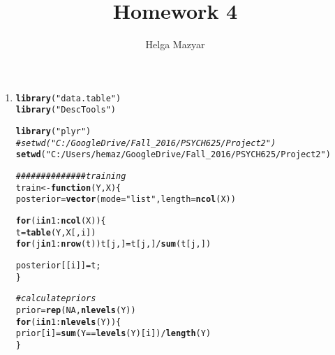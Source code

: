 \documentclass{article}\usepackage[]{graphicx}\usepackage[]{color}
\makeatletter
\newcommand{\hlnum}[1]{\textcolor[rgb]{0.686,0.059,0.569}{#1}}%
\newcommand{\hlstr}[1]{\textcolor[rgb]{0.192,0.494,0.8}{#1}}%
\newcommand{\hlcom}[1]{\textcolor[rgb]{0.678,0.584,0.686}{\textit{#1}}}%
\newcommand{\hlopt}[1]{\textcolor[rgb]{0,0,0}{#1}}%
\newcommand{\hlstd}[1]{\textcolor[rgb]{0.345,0.345,0.345}{#1}}%
\newcommand{\hlkwa}[1]{\textcolor[rgb]{0.161,0.373,0.58}{\textbf{#1}}}%
\newcommand{\hlkwb}[1]{\textcolor[rgb]{0.69,0.353,0.396}{#1}}%
\newcommand{\hlkwc}[1]{\textcolor[rgb]{0.333,0.667,0.333}{#1}}%
\newcommand{\hlkwd}[1]{\textcolor[rgb]{0.737,0.353,0.396}{\textbf{#1}}}%
\newenvironment{kframe}{%
 \def\at@end@of@kframe{}%
 \ifinner\ifhmode%
  \def\at@end@of@kframe{\end{minipage}}%
  \begin{minipage}{\columnwidth}%
 \fi\fi%
 \def\FrameCommand##1{\hskip\@totalleftmargin \hskip-\fboxsep
 \colorbox{shadecolor}{##1}\hskip-\fboxsep
     \hskip-\linewidth \hskip-\@totalleftmargin \hskip\columnwidth}%
 \MakeFramed {\advance\hsize-\width
   \@totalleftmargin\z@ \linewidth\hsize
   \@setminipage}}%
 {\par\unskip\endMakeFramed%
 \at@end@of@kframe}
\newenvironment{knitrout}{}{} %
\makeatother
\begin{document}
\title{Homework 4}

\author{Helga Mazyar}

\maketitle
\begin{enumerate}
  \item 


\begin{knitrout}
\color{fgcolor}\begin{kframe}
\begin{alltt}
  \hlkwd{library}\hlstd{(}\hlstr{"data.table"}\hlstd{)}
\hlkwd{library}\hlstd{(}\hlstr{"DescTools"}\hlstd{)}
\end{alltt}


{\ttfamily\noindent\itshape\color{messagecolor}{\#\# \\\#\# Attaching package: 'DescTools'}}

{\ttfamily\noindent\itshape\color{messagecolor}{\#\# The following object is masked from 'package:data.table':\\\#\# \\\#\#\ \ \ \  \%like\%}}\begin{alltt}
\hlkwd{library}\hlstd{(}\hlstr{"plyr"}\hlstd{)}
\hlcom{#setwd("C:/GoogleDrive/Fall_2016/PSYCH 625/Project2")}
\hlkwd{setwd}\hlstd{(}\hlstr{"C:/Users/hemaz/Google Drive/Fall_2016/PSYCH 625/Project2"}\hlstd{)}

\hlcom{############## training }
\hlstd{train} \hlkwb{<-} \hlkwa{function} \hlstd{(}\hlkwc{Y}\hlstd{,} \hlkwc{X}\hlstd{) \{}
  \hlstd{posterior} \hlkwb{=} \hlkwd{vector}\hlstd{(}\hlkwc{mode} \hlstd{=} \hlstr{"list"}\hlstd{,} \hlkwc{length} \hlstd{=} \hlkwd{ncol}\hlstd{(X))}

  \hlkwa{for} \hlstd{(i} \hlkwa{in} \hlnum{1}\hlopt{:}\hlkwd{ncol}\hlstd{(X))\{}
    \hlstd{t} \hlkwb{=} \hlkwd{table}\hlstd{(Y, X[,i] )}
    \hlkwa{for} \hlstd{(j} \hlkwa{in} \hlnum{1}\hlopt{:}\hlkwd{nrow}\hlstd{(t)) t[j,]}\hlkwb{=} \hlstd{t[j,]}\hlopt{/}\hlkwd{sum}\hlstd{(t[j,])}

    \hlstd{posterior[[i]]} \hlkwb{=} \hlstd{t;}
  \hlstd{\}}

  \hlcom{# calculate priors}
  \hlstd{prior} \hlkwb{=} \hlkwd{rep}\hlstd{(}\hlnum{NA}\hlstd{,} \hlkwd{nlevels}\hlstd{(Y))}
  \hlkwa{for}\hlstd{(i} \hlkwa{in} \hlnum{1}\hlopt{:}\hlkwd{nlevels}\hlstd{(Y))\{}
    \hlstd{prior[i]} \hlkwb{=} \hlkwd{sum}\hlstd{(Y}\hlopt{==}\hlkwd{levels}\hlstd{(Y)[i])}\hlopt{/}\hlkwd{length}\hlstd{(Y)}
  \hlstd{\}}


\end{alltt}
\end{kframe}
\end{knitrout}
\end{enumerate}
\end{document}
